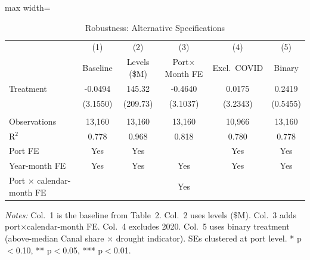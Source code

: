 \begin{table}[H]
\centering
\caption{Robustness: Alternative Specifications}
\label{tab:alt_specs}
\begin{adjustbox}{max width=\textwidth}
\begin{tabular}{lccccc}
\toprule
& (1) & (2) & (3) & (4) & (5) \\
& Baseline & Levels (\$M) & Port$\times$Month FE & Excl.\ COVID & Binary \\
\midrule
Treatment & -0.0494 & 145.32 & -0.4640 & 0.0175 & 0.2419 \\
& (3.1550) & (209.73) & (3.1037) & (3.2343) & (0.5455) \\
\\
Observations & 13,160 & 13,160 & 13,160 & 10,966 & 13,160 \\
R$^2$ & 0.778 & 0.968 & 0.818 & 0.780 & 0.778 \\
Port FE & Yes & Yes & & Yes & Yes \\
Year-month FE & Yes & Yes & Yes & Yes & Yes \\
Port $\times$ calendar-month FE & & & Yes & & \\
\bottomrule
\end{tabular}
\end{adjustbox}
\par\vspace{0.3em}
{\footnotesize \textit{Notes:} Col.~1 is the baseline from Table~2. Col.~2 uses levels (\$M). Col.~3 adds port$\times$calendar-month FE. Col.~4 excludes 2020. Col.~5 uses binary treatment (above-median Canal share $\times$ drought indicator). SEs clustered at port level. * p$<$0.10, ** p$<$0.05, *** p$<$0.01.}
\end{table}
